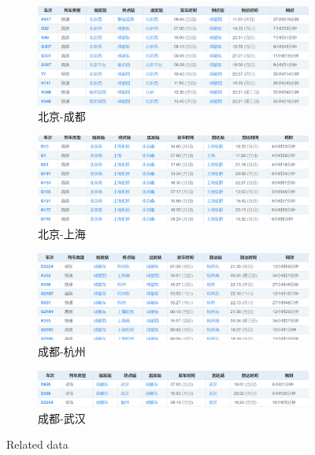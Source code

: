 \documentclass[12pt, a4paper, oneside]{ctexart}
\begin{document}
\begin{figure}[htbp]
\begin{subfigure}{0.3\linewidth}
        \includegraphics[width=\linewidth]{src/B_C.png}
        \caption{北京-成都}
    \end{subfigure}
    \begin{subfigure}{0.3\linewidth}
        \includegraphics[width=\linewidth]{src/B_s.png}
        \caption{北京-上海}
    \end{subfigure}
    \begin{subfigure}{0.3\linewidth}
        \includegraphics[width=\linewidth]{src/C_H.png}
        \caption{成都-杭州}
    \end{subfigure}
    \vspace{0.5cm}
    \begin{subfigure}{0.3\linewidth}
        \includegraphics[width=\linewidth]{src/C_w.png}
        \caption{成都-武汉}
    \end{subfigure}
    \caption{Related data}
\end{figure}
\end{document}
